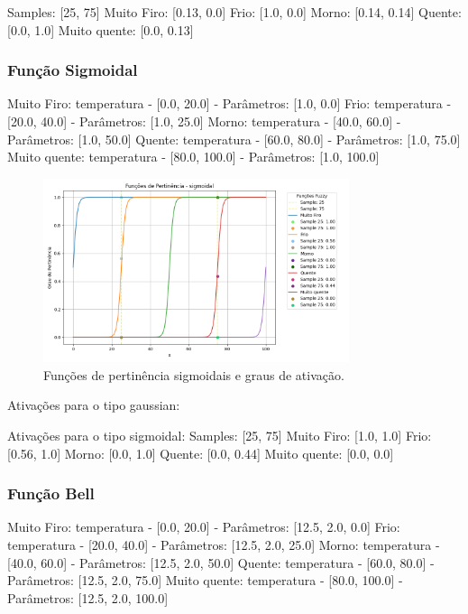\documentclass[a4paper,12pt]{article}
\begin{document}
Samples: [25, 75]
Muito Firo: [0.13, 0.0]
Frio: [1.0, 0.0]
Morno: [0.14, 0.14]
Quente: [0.0, 1.0]
Muito quente: [0.0, 0.13]

\subsubsection{Função Sigmoidal}

Muito Firo: temperatura - [0.0, 20.0] - Parâmetros: [1.0, 0.0]
Frio: temperatura - [20.0, 40.0] - Parâmetros: [1.0, 25.0]
Morno: temperatura - [40.0, 60.0] - Parâmetros: [1.0, 50.0]
Quente: temperatura - [60.0, 80.0] - Parâmetros: [1.0, 75.0]
Muito quente: temperatura - [80.0, 100.0] - Parâmetros: [1.0, 100.0]

\begin{figure}[H]
    \centering
    \includegraphics[width=0.8\textwidth]{img/funções_de_pertinência_sigmoidal_fuzzificado.png}
    \caption{Funções de pertinência sigmoidais e graus de ativação.}
\end{figure}
Ativações para o tipo gaussian:

Ativações para o tipo sigmoidal:
Samples: [25, 75]
Muito Firo: [1.0, 1.0]
Frio: [0.56, 1.0]
Morno: [0.0, 1.0]
Quente: [0.0, 0.44]
Muito quente: [0.0, 0.0]


\subsubsection{Função Bell}

Muito Firo: temperatura - [0.0, 20.0] - Parâmetros: [12.5, 2.0, 0.0]
Frio: temperatura - [20.0, 40.0] - Parâmetros: [12.5, 2.0, 25.0]
Morno: temperatura - [40.0, 60.0] - Parâmetros: [12.5, 2.0, 50.0]
Quente: temperatura - [60.0, 80.0] - Parâmetros: [12.5, 2.0, 75.0]
Muito quente: temperatura - [80.0, 100.0] - Parâmetros: [12.5, 2.0, 100.0]
\end{document}

